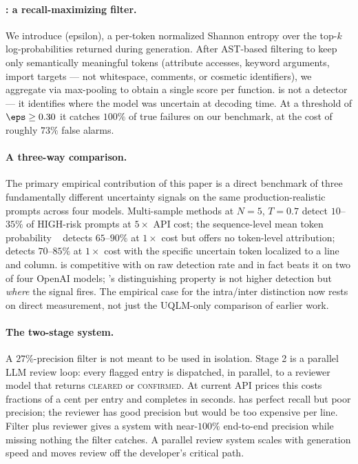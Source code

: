 \paragraph{\eps: a recall-maximizing filter.}
We introduce \eps (epsilon), a per-token normalized Shannon entropy over
the top-$k$ log-probabilities returned during generation. After AST-based
filtering to keep only semantically meaningful tokens (attribute accesses,
keyword arguments, import targets --- not whitespace, comments, or
cosmetic identifiers), we aggregate via max-pooling to obtain a single
score per function. \eps is not a detector --- it identifies where the
model was uncertain at decoding time. At a threshold of $\eps \ge 0.30$
it catches $100\%$ of true failures on our benchmark, at the cost of
roughly $73\%$ false alarms.

\paragraph{A three-way comparison.}
The primary empirical contribution of this paper is a direct benchmark of
three fundamentally different uncertainty signals on the same
production-realistic prompts across four models. Multi-sample methods at
$N=5$, $T=0.7$ detect $10$--$35\%$ of HIGH-risk prompts at $5\times$ API
cost; the sequence-level mean token probability \papg~\cite{spiess2025calibration}
detects $65$--$90\%$ at $1\times$ cost but offers no token-level
attribution; \eps detects $70$--$85\%$ at $1\times$ cost with the specific
uncertain token localized to a line and column. \papg is competitive with
\eps on raw detection rate and in fact beats it on two of four OpenAI
models; \eps's distinguishing property is not higher detection but
\emph{where} the signal fires. The empirical case for the intra/inter
distinction now rests on direct measurement, not just the UQLM-only
comparison of earlier work.

\paragraph{The two-stage system.}
A $27\%$-precision filter is not meant to be used in isolation. Stage 2
is a parallel LLM review loop: every flagged entry is dispatched, in
parallel, to a reviewer model that returns \textsc{cleared} or
\textsc{confirmed}. At current API prices this costs fractions of a cent
per entry and completes in seconds. \eps has perfect recall but poor
precision; the reviewer has good precision but would be too expensive per
line. Filter plus reviewer gives a system with near-$100\%$ end-to-end
precision while missing nothing the filter catches. A parallel review
system scales with generation speed and moves review off the developer's
critical path.

